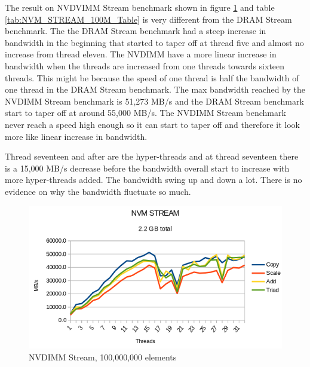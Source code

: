 \documentclass[12pt,a4paper,USenglish]{article}      %
\begin{document}
The result on NVDVIMM Stream benchmark shown in figure \ref{fig:NVM_STREAM_100M_Figure} and table \ref{tab:NVM_STREAM_100M_Table} is very different from the DRAM Stream benchmark. The the DRAM Stream benchmark had a steep increase in bandwidth in the beginning that started to taper off at thread five and almost no increase from thread eleven. The NVDIMM have a more linear increase in bandwidth when the threads are increased from one threads towards sixteen threads. 
This might be because the speed of one thread is half the bandwidth of one thread in the DRAM Stream benchmark. 
The max bandwidth reached by the NVDIMM Stream benchmark is 51,273 MB/s and the DRAM Stream benchmark start to taper off at around 55,000 MB/s. The NVDIMM Stream benchmark never reach a speed high enough so it can start to taper off and therefore it look more like linear increase in bandwidth.

Thread seventeen and after are the hyper-threads and at thread seventeen there is a 15,000 MB/s decrease before the bandwidth overall start to increase with more hyper-threads added. The bandwidth swing up and down a lot. There is no evidence on why the bandwidth fluctuate so much. 

\begin{figure}[!hbtp]
\includegraphics[scale=0.7]{Benchmarks/NVM_STREAM_100M_Figure.png}
\caption{NVDIMM Stream, 100,000,000 elements}
\label{fig:NVM_STREAM_100M_Figure}
\end{figure}
\end{document}

